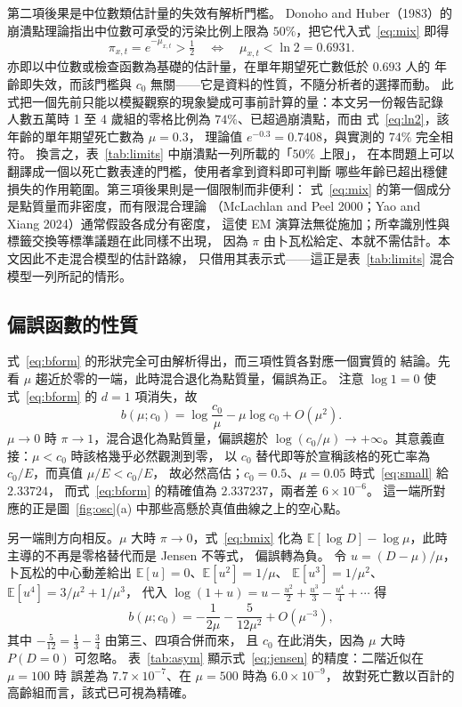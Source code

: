 \documentclass[UTF8, fontset=macnew, a4paper, 12pt]{ctexart}
\newcommand{\Ex}{\mathbb{E}}
\begin{document}
第二項後果是中位數類估計量的失效有解析門檻。
Donoho and Huber（1983）的崩潰點理論指出中位數可承受的污染比例上限為
$50\%$，把它代入式~\eqref{eq:mix} 即得
\begin{equation}\label{eq:ln2}
\pi_{x,t}=e^{-\mu_{x,t}}>\tfrac12
\quad\Longleftrightarrow\quad
\mu_{x,t}<\ln 2=0.6931 .
\end{equation}
亦即以中位數或檢查函數為基礎的估計量，在單年期望死亡數低於 $0.693$ 人的
年齡即失效，而該門檻與 $c_0$ 無關——它是資料的性質，不隨分析者的選擇而動。
此式把一個先前只能以模擬觀察的現象變成可事前計算的量：本文另一份報告記錄
人數五萬時 1 至 4 歲組的零格比例為 $74\%$、已超過崩潰點，而由
式~\eqref{eq:ln2}，該年齡的單年期望死亡數為 $\mu=0.3$，
理論值 $e^{-0.3}=0.7408$，與實測的 $74\%$ 完全相符。
換言之，表~\ref{tab:limits} 中崩潰點一列所載的「$50\%$ 上限」，
在本問題上可以翻譯成一個以死亡數表達的門檻，使用者拿到資料即可判斷
哪些年齡已超出穩健損失的作用範圍。第三項後果則是一個限制而非便利：
式~\eqref{eq:mix} 的第一個成分是點質量而非密度，而有限混合理論
（McLachlan and Peel 2000；Yao and Xiang 2024）通常假設各成分有密度，
這使 EM 演算法無從施加；所幸識別性與標籤交換等標準議題在此同樣不出現，
因為 $\pi$ 由卜瓦松給定、本就不需估計。本文因此不走混合模型的估計路線，
只借用其表示式——這正是表~\ref{tab:limits} 混合模型一列所記的情形。

\subsection{偏誤函數的性質}

式~\eqref{eq:bform} 的形狀完全可由解析得出，而三項性質各對應一個實質的
結論。先看 $\mu$ 趨近於零的一端，此時混合退化為點質量，偏誤為正。
注意 $\log 1=0$ 使式~\eqref{eq:bform} 的 $d=1$ 項消失，故
\begin{equation}\label{eq:small}
b(\mu;c_0)=\log\frac{c_0}{\mu}-\mu\log c_0+O(\mu^2).
\end{equation}
$\mu\to0$ 時 $\pi\to1$，混合退化為點質量，偏誤趨於
$\log(c_0/\mu)\to+\infty$。其意義直接：$\mu<c_0$ 時該格幾乎必然觀測到零，
以 $c_0$ 替代即等於宣稱該格的死亡率為 $c_0/E$，而真值 $\mu/E<c_0/E$，
故必然高估；$c_0=0.5$、$\mu=0.05$ 時式~\eqref{eq:small} 給 $2.33724$，
而式~\eqref{eq:bform} 的精確值為 $2.337237$，兩者差 $6\times10^{-6}$。
這一端所對應的正是圖~\ref{fig:osc}(a) 中那些高懸於真值曲線之上的空心點。

另一端則方向相反。$\mu$ 大時 $\pi\to0$，式~\eqref{eq:bmix} 化為
$\Ex[\log D]-\log\mu$，此時主導的不再是零格替代而是 Jensen 不等式，
偏誤轉為負。
令 $u=(D-\mu)/\mu$，卜瓦松的中心動差給出 $\Ex[u]=0$、$\Ex[u^2]=1/\mu$、
$\Ex[u^3]=1/\mu^2$、$\Ex[u^4]=3/\mu^2+1/\mu^3$，
代入 $\log(1+u)=u-\tfrac{u^2}2+\tfrac{u^3}3-\tfrac{u^4}4+\cdots$ 得
\begin{equation}\label{eq:jensen}
b(\mu;c_0)=-\frac{1}{2\mu}-\frac{5}{12\mu^{2}}+O(\mu^{-3}),
\end{equation}
其中 $-\tfrac5{12}=\tfrac13-\tfrac34$ 由第三、四項合併而來，
且 $c_0$ 在此消失，因為 $\mu$ 大時 $P(D=0)$ 可忽略。
表~\ref{tab:asym} 顯示式~\eqref{eq:jensen} 的精度：二階近似在 $\mu=100$ 時
誤差為 $7.7\times10^{-7}$、在 $\mu=500$ 時為 $6.0\times10^{-9}$，
故對死亡數以百計的高齡組而言，該式已可視為精確。
\end{document}
